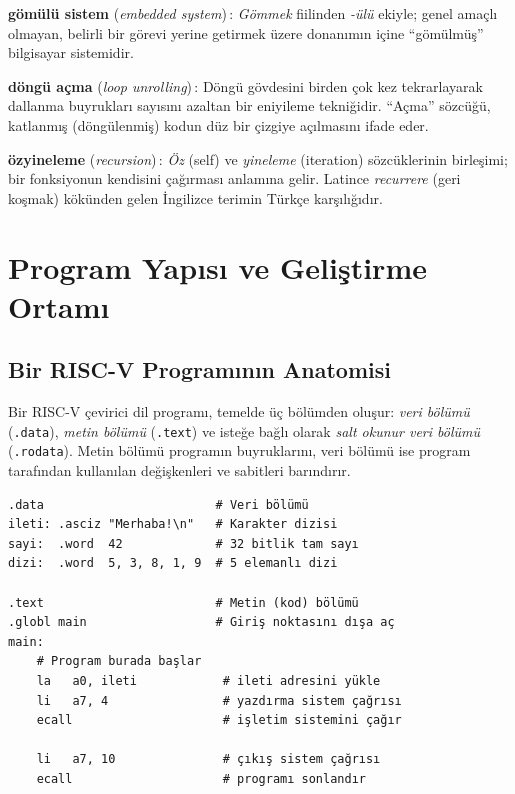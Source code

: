 \begin{terimnotu}
\textbf{gömülü sistem} (\emph{embedded system})\,: \emph{Gömmek} fiilinden \emph{-ülü} ekiyle; genel amaçlı olmayan, belirli bir görevi yerine getirmek üzere donanımın içine ``gömülmüş'' bilgisayar sistemidir.

\textbf{döngü açma} (\emph{loop unrolling})\,: Döngü gövdesini birden çok kez tekrarlayarak dallanma buyrukları sayısını azaltan bir eniyileme tekniğidir. ``Açma'' sözcüğü, katlanmış (döngülenmiş) kodun düz bir çizgiye açılmasını ifade eder.

\textbf{özyineleme} (\emph{recursion})\,: \emph{Öz} (self) ve \emph{yineleme} (iteration) sözcüklerinin birleşimi; bir fonksiyonun kendisini çağırması anlamına gelir. Latince \emph{recurrere} (geri koşmak) kökünden gelen İngilizce terimin Türkçe karşılığıdır.
\end{terimnotu}


\section{Program Yapısı ve Geliştirme Ortamı}
\label{sec:program-yapisi}

\subsection{Bir RISC-V Programının Anatomisi}
\label{subsec:program-anatomisi}

Bir RISC-V çevirici dil programı, temelde üç bölümden oluşur: \emph{veri bölümü} (\texttt{.data}), \emph{metin bölümü} (\texttt{.text}) ve isteğe bağlı olarak \emph{salt okunur veri bölümü} (\texttt{.rodata}). Metin bölümü programın buyruklarını, veri bölümü ise program tarafından kullanılan değişkenleri ve sabitleri barındırır.

\begin{lstlisting}[style=riscv]
.data                        # Veri bölümü
ileti: .asciz "Merhaba!\n"   # Karakter dizisi
sayi:  .word  42             # 32 bitlik tam sayı
dizi:  .word  5, 3, 8, 1, 9  # 5 elemanlı dizi

.text                        # Metin (kod) bölümü
.globl main                  # Giriş noktasını dışa aç
main:
    # Program burada başlar
    la   a0, ileti            # ileti adresini yükle
    li   a7, 4                # yazdırma sistem çağrısı
    ecall                     # işletim sistemini çağır

    li   a7, 10               # çıkış sistem çağrısı
    ecall                     # programı sonlandır
\end{lstlisting}

